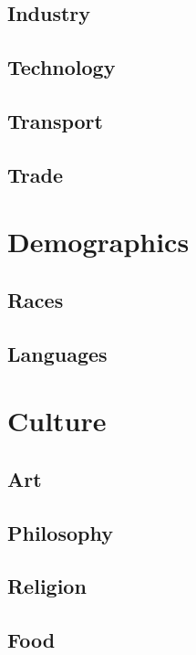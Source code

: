 \documentclass[11pt]{article}
\begin{document}
\subsection{Industry}
\label{sec:orgceb1c9d}
\subsection{Technology}
\label{sec:org70358be}
\subsection{Transport}
\label{sec:org34af00f}
\subsection{Trade}
\label{sec:org8962678}
\section{Demographics}
\label{sec:org07c9506}
\subsection{Races}
\label{sec:org90e5d67}
\subsection{Languages}
\label{sec:orga649288}
\section{Culture}
\label{sec:org3e12321}
\subsection{Art}
\label{sec:orgfad0d51}
\subsection{Philosophy}
\label{sec:org9c49a8f}
\subsection{Religion}
\label{sec:org7243035}
\subsection{Food}
\label{sec:org20fd693}
\end{document}
